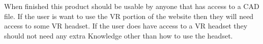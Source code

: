 \documentclass[letterpaper, 10pt, draftclsnofoot, onecolumn]{IEEEtran}
\begin{document}
{\begin{comment}
{\selectlanguage{english}\itshape\color{black}
This subsection of the document should describe those general
characteristics of the intended users of the product including
educational level, experience, and technical expertise. \ It should not
be used to state specific requirements, but rather should provide
the reasons why certain specific requirements are later
specied in Section 3 of this document.}
\end{comment}
{\color{black}
When finished this product should be usable by anyone that has access to a CAD file. If the user is want to use the VR portion of the website then they will need access to some VR headset. If the user does have access to a VR headset they should not need any extra Knowledge other than how to use the headset.  }
\begin{comment}

\subsection[CONSTRAINTS]{\selectlanguage{english}\rmfamily\bfseries\color{black}
CONSTRAINTS}
{\selectlanguage{english}\itshape\color{black}
This subsection of the document should provide a general description of
any other items that will limit the developer{\textquoteright}s
options. \ These include: a) Regulatory policies; b) Hardware
limitations (e.g., signal timing requirements); c) Interfaces to other
applications; d) Parallel operation; e) Audit functions; f) Control
functions; g) Higher-order language requirements; h) Signal handshake
protocols; i) Reliability requirements; j) Criticality of the
application; k) Safety and security considerations.}

{\selectlanguage{english}\color{black}
[ insert your text here ]}

\subsection[ASSUMPTIONS AND
DEPENDENCIES]{\selectlanguage{english}\rmfamily\bfseries\color{black}
ASSUMPTIONS AND DEPENDENCIES}
{\selectlanguage{english}\itshape\color{black}
This subsection of the document should list each of the factors that
affect the requirements stated in the document. \ These factors are not
design constraints on the system and/or software but are, rather, any
changes to them that can affect the requirements in the document. For
example, an assumption may be that a speci[FB01?]c operating system
will be available on the hardware designated for the software product.
\ If, in fact, the operating system is not available, the document
would then have to change accordingly.}


\end{comment}}
\end{document}

